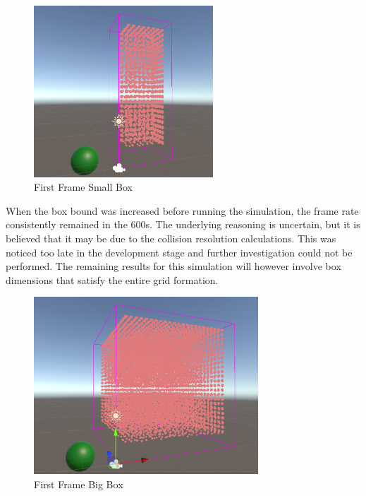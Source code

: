 \documentclass[12pt]{article}
\begin{document}
    \begin{figure}[H]
        \begin{center}
            \includegraphics[width=0.6\textwidth]{firstFrameSmallBox.png}
            \caption{First Frame Small Box}
        \end{center}
    \end{figure}
    
    When the box bound was increased before running the simulation, the frame rate consistently remained in the 600s. The underlying reasoning is uncertain, but it is believed that it may be due to the collision resolution calculations. This was noticed too late in the development stage and further investigation could not be performed. The remaining results for this simulation will however involve box dimensions that satisfy the entire grid formation.

    \begin{figure}[H]
        \begin{center}
            \includegraphics[width=0.75\textwidth]{firstFrameBigBox.png}
            \caption{First Frame Big Box}
        \end{center}
    \end{figure}
\end{document}
